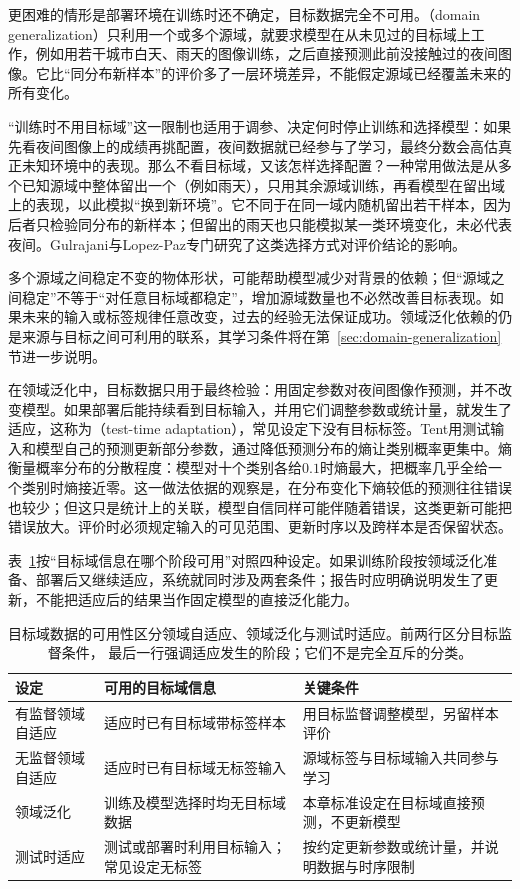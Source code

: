 更困难的情形是部署环境在训练时还不确定，目标数据完全不可用。（domain generalization）只利用一个或多个源域，就要求模型在从未见过的目标域上工作，例如用若干城市白天、雨天的图像训练，之后直接预测此前没接触过的夜间图像。它比“同分布新样本”的评价多了一层环境差异，不能假定源域已经覆盖未来的所有变化。

“训练时不用目标域”这一限制也适用于调参、决定何时停止训练和选择模型：如果先看夜间图像上的成绩再挑配置，夜间数据就已经参与了学习，最终分数会高估真正未知环境中的表现。那么不看目标域，又该怎样选择配置？一种常用做法是从多个已知源域中整体留出一个（例如雨天），只用其余源域训练，再看模型在留出域上的表现，以此模拟“换到新环境”。它不同于在同一域内随机留出若干样本，因为后者只检验同分布的新样本；但留出的雨天也只能模拟某一类环境变化，未必代表夜间。Gulrajani与Lopez-Paz专门研究了这类选择方式对评价结论的影响。

多个源域之间稳定不变的物体形状，可能帮助模型减少对背景的依赖；但“源域之间稳定”不等于“对任意目标域都稳定”，增加源域数量也不必然改善目标表现。如果未来的输入或标签规律任意改变，过去的经验无法保证成功。领域泛化依赖的仍是来源与目标之间可利用的联系，其学习条件将在第~\ref{sec:domain-generalization}节进一步说明。

在领域泛化中，目标数据只用于最终检验：用固定参数对夜间图像作预测，并不改变模型。如果部署后能持续看到目标输入，并用它们调整参数或统计量，就发生了适应，这称为（test-time adaptation），常见设定下没有目标标签。Tent用测试输入和模型自己的预测更新部分参数，通过降低预测分布的熵让类别概率更集中。熵衡量概率分布的分散程度：模型对十个类别各给$0.1$时熵最大，把概率几乎全给一个类别时熵接近零。这一做法依据的观察是，在分布变化下熵较低的预测往往错误也较少；但这只是统计上的关联，模型自信同样可能伴随着错误，这类更新可能把错误放大。评价时必须规定输入的可见范围、更新时序以及跨样本是否保留状态。

表~\ref{tab:domain-transfer-settings}按“目标域信息在哪个阶段可用”对照四种设定。如果训练阶段按领域泛化准备、部署后又继续适应，系统就同时涉及两套条件；报告时应明确说明发生了更新，不能把适应后的结果当作固定模型的直接泛化能力。

\begin{table}[htbp]
  \centering
  \small
  \begin{tabularx}{\linewidth}{@{}lXX@{}}
    \toprule
    \textbf{设定} & \textbf{可用的目标域信息} & \textbf{关键条件} \\
    \midrule
    有监督领域自适应 & 适应时已有目标域带标签样本 & 用目标监督调整模型，另留样本评价 \\
    无监督领域自适应 & 适应时已有目标域无标签输入 & 源域标签与目标域输入共同参与学习 \\
    领域泛化 & 训练及模型选择时均无目标域数据 & 本章标准设定在目标域直接预测，不更新模型 \\
    测试时适应 & 测试或部署时利用目标输入；常见设定无标签 & 按约定更新参数或统计量，并说明数据与时序限制 \\
    \bottomrule
  \end{tabularx}
  \caption{目标域数据的可用性区分领域自适应、领域泛化与测试时适应。前两行区分目标监督条件，
  最后一行强调适应发生的阶段；它们不是完全互斥的分类。}
  \label{tab:domain-transfer-settings}
\end{table}


